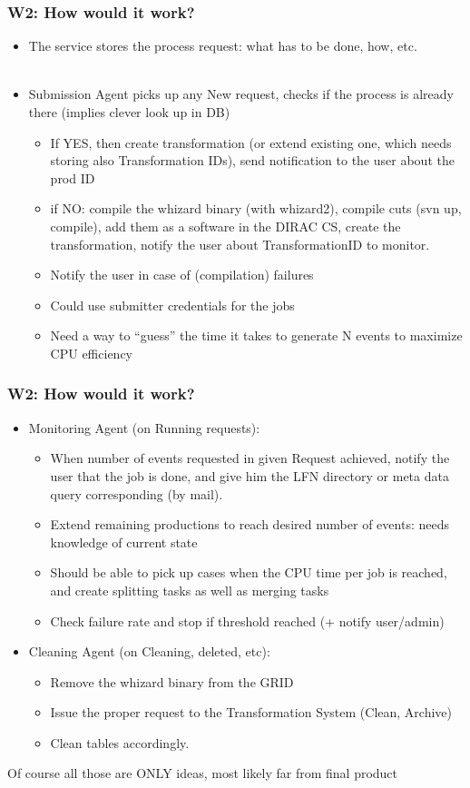 \documentclass[10pt,table,dvipsnames]{beamer}
\begin{document}
\begin{frame}
\frametitle{W2: How would it work?}
\begin{itemize}
  \item The service stores the process request: what has to be done,
  how, etc.\\
~\\
  \item Submission Agent picks up any New request, checks if the process is
  already there (implies clever look up in DB)
  \begin{itemize}
    \item If YES, then create transformation (or extend existing one,
    which needs storing also Transformation IDs),
    send notification to the user about the prod ID
    \item if NO: compile the whizard binary (with whizard2), compile
    cuts (svn up, compile),  add them as a software in the
    DIRAC CS, create the transformation, notify the user about
    TransformationID to monitor. 
    \item Notify the user in case of
    (compilation) failures
    \item Could use submitter credentials for the jobs
    \item Need a way to ``guess'' the time it takes to generate N
    events to maximize CPU efficiency
  \end{itemize}
\end{itemize}
\end{frame}

\begin{frame}
  \frametitle{W2: How would it work?}
\begin{itemize}
  \item Monitoring Agent (on Running requests): 
  \begin{itemize}
    \item When number of events requested in given
     Request achieved, notify the user that the job is
     done, and give him the LFN directory or meta data query
     corresponding (by mail).
    \item Extend remaining productions to reach desired number of
     events: needs knowledge of current state
    \item Should be able to pick up cases when the CPU time per job is
     reached, and create splitting tasks as well as merging tasks
    \item Check failure rate and stop if threshold reached (+ notify user/admin)
  \end{itemize}
  \item Cleaning Agent (on Cleaning, deleted, etc):
  \begin{itemize}
    \item Remove the whizard binary from the GRID
    \item Issue the proper request to the Transformation System (Clean,
      Archive)
    \item Clean tables accordingly.
  \end{itemize}
\end{itemize}
Of course all those are ONLY ideas, most likely far from final product
\end{frame}
\end{document}
